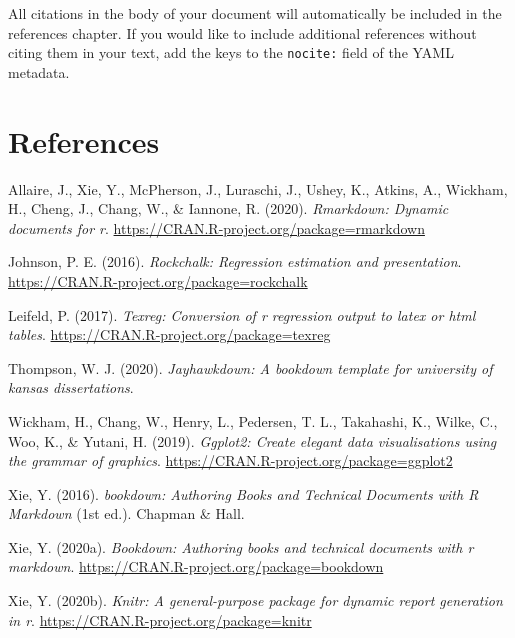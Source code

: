 \documentclass[12pt,english]{kuthesis}
\begin{document}
All citations in the body of your document will automatically be included in the references chapter. If you would like to include additional references without citing them in your text, add the keys to the \texttt{nocite:} field of the YAML metadata.

\hypertarget{references}{%
\chapter*{References}\label{references}}

\setlength{\parindent}{-15pt}
\setlength{\leftskip}{15pt}

\noindent

\hypertarget{refs}{}
\leavevmode\hypertarget{ref-R-rmarkdown}{}%
Allaire, J., Xie, Y., McPherson, J., Luraschi, J., Ushey, K., Atkins, A., Wickham, H., Cheng, J., Chang, W., \& Iannone, R. (2020). \emph{Rmarkdown: Dynamic documents for r}. \url{https://CRAN.R-project.org/package=rmarkdown}

\leavevmode\hypertarget{ref-R-rockchalk}{}%
Johnson, P. E. (2016). \emph{Rockchalk: Regression estimation and presentation}. \url{https://CRAN.R-project.org/package=rockchalk}

\leavevmode\hypertarget{ref-R-texreg}{}%
Leifeld, P. (2017). \emph{Texreg: Conversion of r regression output to latex or html tables}. \url{https://CRAN.R-project.org/package=texreg}

\leavevmode\hypertarget{ref-R-jayhawkdown}{}%
Thompson, W. J. (2020). \emph{Jayhawkdown: A bookdown template for university of kansas dissertations}.

\leavevmode\hypertarget{ref-R-ggplot2}{}%
Wickham, H., Chang, W., Henry, L., Pedersen, T. L., Takahashi, K., Wilke, C., Woo, K., \& Yutani, H. (2019). \emph{Ggplot2: Create elegant data visualisations using the grammar of graphics}. \url{https://CRAN.R-project.org/package=ggplot2}

\leavevmode\hypertarget{ref-bookdown}{}%
Xie, Y. (2016). \emph{bookdown: Authoring Books and Technical Documents with R Markdown} (1st ed.). Chapman \& Hall.

\leavevmode\hypertarget{ref-R-bookdown}{}%
Xie, Y. (2020a). \emph{Bookdown: Authoring books and technical documents with r markdown}. \url{https://CRAN.R-project.org/package=bookdown}

\leavevmode\hypertarget{ref-R-knitr}{}%
Xie, Y. (2020b). \emph{Knitr: A general-purpose package for dynamic report generation in r}. \url{https://CRAN.R-project.org/package=knitr}
\end{document}
